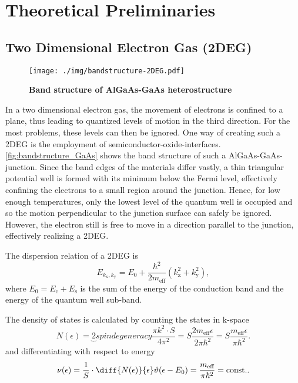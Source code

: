 \chapter{Theoretical Preliminaries}

\section{Two Dimensional Electron Gas (2DEG)}
\begin{figure}
	\centering
	\texttt{[image: ./img/bandstructure-2DEG.pdf]}
	\caption[Band structure of AlGaAs-GaAs heterostructure]{\textbf{Band structure of AlGaAs-GaAs heterostructure}}
	\label{fig:bandstructure_GaAs}
\end{figure}
In a two dimensional electron gas, the movement of electrons is confined to a plane, thus leading to quantized levels of motion in the third direction.
For the most problems, these levels can then be ignored.
One way of creating such a 2DEG is the employment of semiconductor-oxide-interfaces.
\autoref{fig:bandstructure_GaAs} shows the band structure of such a AlGaAs-GaAs-junction.
Since the band edges of the materials differ vastly, a thin triangular potential well is formed with its minimum below the Fermi level, effectively confining the electrons to a small region around the junction.
Hence, for low enough temperatures, only the lowest level of the quantum well is occupied and so the motion perpendicular to the junction surface can safely be ignored.
However, the electron still is free to move in a direction parallel to the junction, effectively realizing a 2DEG.

The dispersion relation of a 2DEG is
\begin{equation}\label{eq:subband}
	E_{k_\text{x}, k_\text{y}} = E_0 + \frac{\hbar^2}{2m_\text{eff}}\left(k_\text{x}^2 + k_\text{y}^2\right),
\end{equation}
where $E_0=E_\text{c} + E_\text{s}$ is the sum of the energy of the conduction band and the energy of the quantum well sub-band.

The density of states is calculated by counting the states in k-space
\begin{equation*}
	N(\epsilon) = \underbrace{2}{spin degeneracy}\frac{\pi k^2\cdot S}{4\pi^2} = S\frac{2m_\text{eff}\epsilon}{2\pi\hbar^2} = S\frac{m_\text{eff}\epsilon}{\pi\hbar^2}.
\end{equation*}
and differentiating with respect to energy
\begin{equation*}
	\nu(\epsilon) = \frac{1}{S}\cdot\diff{N(\epsilon)}{\epsilon}\vartheta(\epsilon-E_0) = \frac{m_\text{eff}}{\pi\hbar^2} = \text{const.}.
\end{equation*}

